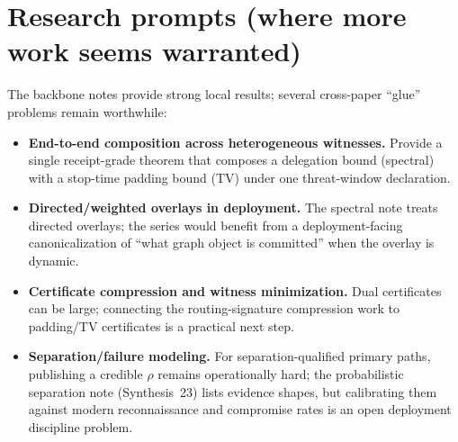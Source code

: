 \documentclass[11pt]{article}
\begin{document}
\section{Research prompts (where more work seems warranted)}
The backbone notes provide strong local results; several cross-paper ``glue'' problems remain worthwhile:
\begin{itemize}[leftmargin=1.2em]
\item \textbf{End-to-end composition across heterogeneous witnesses.} Provide a single receipt-grade theorem that composes a delegation bound (spectral) with a stop-time padding bound (TV) under one threat-window declaration.
\item \textbf{Directed/weighted overlays in deployment.} The spectral note treats directed overlays; the series would benefit from a deployment-facing canonicalization of ``what graph object is committed'' when the overlay is dynamic.
\item \textbf{Certificate compression and witness minimization.} Dual certificates can be large; connecting the routing-signature compression work to padding/TV certificates is a practical next step.\cite{series:routingcompress}
\item \textbf{Separation/failure modeling.} For separation-qualified primary paths, publishing a credible $\rho$ remains operationally hard; the probabilistic separation note (Synthesis~23) lists evidence shapes, but calibrating them against modern reconnaissance and compromise rates is an open deployment discipline problem.\cite{series:probsep}
\end{itemize}
\end{document}
